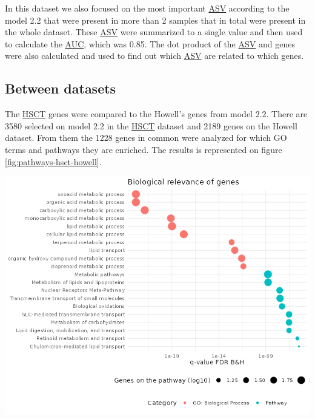 \documentclass[
  12pt,
  a4paper,
  twoside,
  openright]{book}
\let\origfigure\figure
\let\endorigfigure\endfigure
\renewenvironment{figure}[1][2] {
    \expandafter\origfigure\expandafter[!htbp]
} {
    \endorigfigure
}
\begin{document}
In this dataset we also focused on the most important \protect\hyperlink{acronyms_ASV}{ASV} according to the model 2.2 that were present in more than 2 samples that in total were present in the whole dataset.
These \protect\hyperlink{acronyms_ASV}{ASV} were summarized to a single value and then used to calculate the \protect\hyperlink{acronyms_AUC}{AUC}, which was 0.85.
The dot product of the \protect\hyperlink{acronyms_ASV}{ASV} and genes were also calculated and used to find out which \protect\hyperlink{acronyms_ASV}{ASV} are related to which genes.

\FloatBarrier

\hypertarget{between-datasets}{%
\subsection{Between datasets}\label{between-datasets}}

The \protect\hyperlink{acronyms_HSCT}{HSCT} genes were compared to the Howell's genes from model 2.2.
There are 3580 selected on model 2.2 in the \protect\hyperlink{acronyms_HSCT}{HSCT} dataset and 2189 genes on the Howell dataset.
From them the 1228 genes in common were analyzed for which GO terms and pathways they are enriched.
The results is represented on figure \ref{fig:pathways-hsct-howell}.

\begin{figure}
\includegraphics[width=1\linewidth]{images/pathways_hsct_howell} \caption[Pathways from common genes in HSCT and the Howell dataset.]{Significance of pathways on common genes in HSCT and the Howell dataset ordered by p-value, size according to the number of genes on the pathway found on the dataset and color blue for pathways and red for gene ontologies of biological process.}\label{fig:pathways-hsct-howell}
\end{figure}
\end{document}
